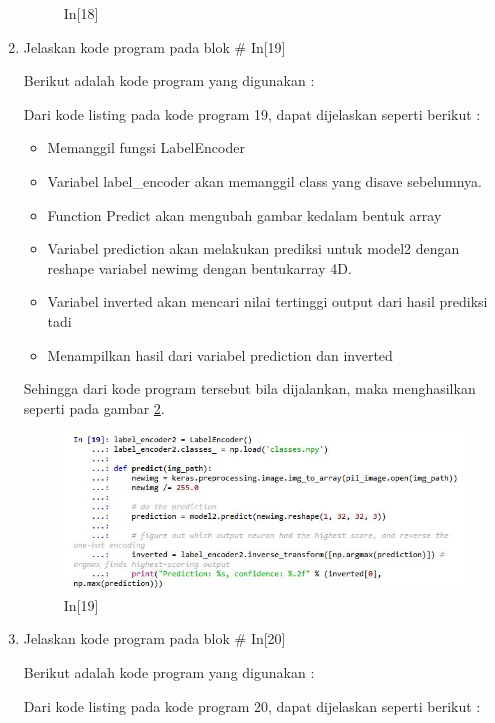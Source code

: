 \begin{enumerate}
\begin{figure}[!htbp]
	\caption{In[18]}
	\label{c7_25}
\end{figure}
\item Jelaskan kode program pada blok \# In[19]
\par Berikut adalah kode program yang digunakan :

\par Dari kode listing pada kode program 19, dapat dijelaskan seperti berikut :
\begin{itemize}
\item Memanggil fungsi LabelEncoder
\item Variabel label\_encoder akan memanggil class yang disave sebelumnya.
\item Function Predict akan mengubah gambar kedalam bentuk array
\item Variabel prediction akan melakukan prediksi untuk model2 dengan reshape variabel newimg dengan bentukarray 4D.
\item Variabel inverted akan mencari nilai tertinggi output dari hasil prediksi tadi
\item Menampilkan hasil dari variabel prediction dan inverted
\end{itemize}
\par Sehingga dari kode program tersebut bila dijalankan, maka menghasilkan seperti pada gambar \ref{c7_26}.
\begin{figure}[!htbp]
	\centerline{\includegraphics[width=1\textwidth]{figures/huda/chapter7/26.JPG}}
	\caption{In[19]}
	\label{c7_26}
\end{figure}
\item Jelaskan kode program pada blok \# In[20]
\par Berikut adalah kode program yang digunakan :

\par Dari kode listing pada kode program 20, dapat dijelaskan seperti berikut :
\begin{itemize}

\end{itemize}
\end{enumerate}
